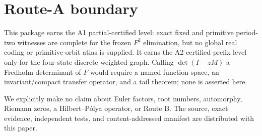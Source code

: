 \documentclass[10pt]{article}
\begin{document}
\section{Route-A boundary}
This package earns the A1 partial-certified level: exact fixed and primitive
period-two witnesses are complete for the frozen $F^2$ elimination, but no
global real coding or primitive-orbit atlas is supplied.  It earns
the A2 certified-prefix level only for the four-state discrete weighted graph.
Calling $\det(I-zM)$ a Fredholm determinant of $F$ would require a named
function space, an invariant/compact transfer operator, and a tail theorem;
none is asserted here.

We explicitly make no claim about Euler factors, root numbers, automorphy,
Riemann zeros, a Hilbert--P\'olya operator, or Route B.  The source, exact
evidence, independent tests, and content-addressed manifest are distributed
with this paper.
\end{document}

